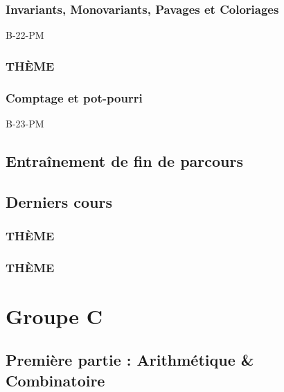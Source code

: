 \documentclass[poly,trombi]{valbonne}
\begin{document}
\subsection{Invariants, Monovariants, Pavages et Coloriages}

{B-22-PM}

\subsection{THÈME}


\subsection{Comptage et pot-pourri}

{B-23-PM}


\section{Entraînement de fin de parcours}



\section{Derniers cours}

\subsection{THÈME}


\subsection{THÈME}







\chapter{Groupe C}

\minitoc \clearpage

\section{Première partie : Arithmétique \& Combinatoire}
\end{document}
